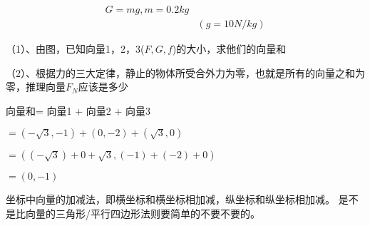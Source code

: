 \documentclass[cn,12pt]{elegantbook}
\begin{document}
\begin{equation}
  \begin{split}G=mg,m=0.2kg \\
   & (g=10N/{kg})
  \end{split}
\end{equation}

（1）、由图，已知向量1，2，3($F,G,f$)的大小，求他们的向量和

（2）、根据力的三大定律，静止的物体所受合外力为零，也就是所有的向量之和为零，推理向量$F_N$应该是多少





向量和= 向量1 + 向量2 + 向量3 

 $= (-\sqrt{3},-1) + (0,-2) + (\sqrt{3},0)$

 $=( (-\sqrt{3})+0+\sqrt{3},(-1)+(-2)+0)$

 $=(0,-1)$

 坐标中向量的加减法，即横坐标和横坐标相加减，纵坐标和纵坐标相加减。
 是不是比向量的三角形/平行四边形法则要简单的不要不要的。



 
   






	
	
\end{document}

